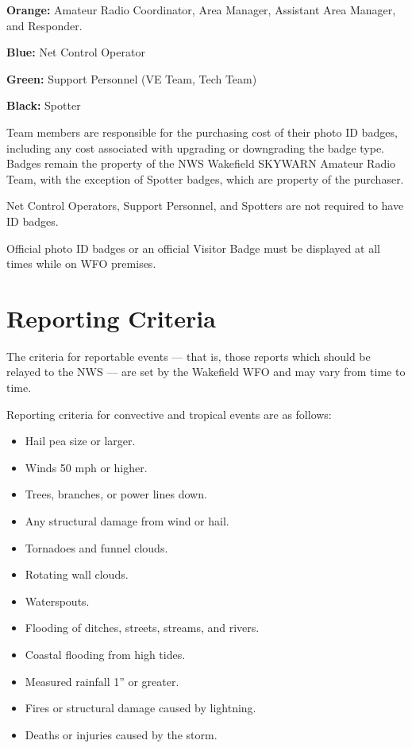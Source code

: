 \documentclass[pdflatex,letterpaper,twoside,12pt]{book}
\begin{document}
\textbf{Orange:}  Amateur Radio Coordinator, Area Manager, Assistant Area Manager, and Responder.

\textbf{Blue:}  Net Control Operator

\textbf{Green:}  Support Personnel (VE Team, Tech Team)

\textbf{Black:}  Spotter

Team members are responsible for the purchasing cost of their photo ID badges, including any cost associated with upgrading or downgrading the badge type.  Badges remain the property of the NWS Wakefield SKYWARN Amateur Radio Team, with the exception of Spotter badges, which are property of the purchaser.

Net Control Operators, Support Personnel, and Spotters are not required to have ID badges.

Official photo ID badges or an official Visitor Badge must be displayed at all times while on WFO premises.


\chapter{Reporting Criteria}\label{reporting-criteria}

The criteria for reportable events –-- that is, those reports which should be relayed to the NWS –-- are set by the Wakefield WFO and may vary from time to time.

Reporting criteria for convective and tropical events are as follows:
\begin{itemize}
\item Hail pea size or larger.
\item Winds 50 mph or higher.
\item Trees, branches, or power lines down.
\item Any structural damage from wind or hail.
\item Tornadoes and funnel clouds.
\item Rotating wall clouds.
\item Waterspouts.
\item Flooding of ditches, streets, streams, and rivers.
\item Coastal flooding from high tides.
\item Measured rainfall 1” or greater.
\item Fires or structural damage caused by lightning.
\item Deaths or injuries caused by the storm.
\end{itemize}
\end{document}

